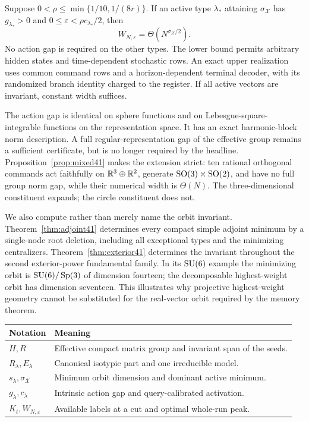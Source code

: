 \begin{theorem}\label{thm:main}
Suppose $0<\rho\le\min\{1/10,1/(8r)\}$. If an active type
$\lambda_*$ attaining $\sigma_{\mathcal X}$ has $g_{\lambda_*}>0$
and $0\le\varepsilon<\rho c_{\lambda_*}/2$, then
\begin{equation}\label{eq:main41}
                 W_{N,\varepsilon}=\Theta(N^{\sigma_{\mathcal X}/2}).
\end{equation}
No action gap is required on the other types. The lower bound permits
arbitrary hidden states and time-dependent stochastic rows. An exact
upper realization uses common command rows and a horizon-dependent
terminal decoder, with its randomized branch identity charged to the
register. If all active vectors are invariant, constant width suffices.
\end{theorem}

The action gap is identical on sphere functions and on Lebesgue-square-
integrable functions on the representation space. It has an exact
harmonic-block norm description. A full regular-representation gap of
the effective group remains a sufficient certificate, but is no longer
required by the headline. Proposition~\ref{prop:mixed41} makes the
extension strict: ten rational orthogonal commands act faithfully on
$\mathbb R^3\oplus\mathbb R^2$, generate $\operatorname{SO}(3)\times\operatorname{SO}(2)$, and have no full
group norm gap, while their numerical width is $\Theta(N)$. The
three-dimensional constituent expands; the circle constituent does not.

We also compute rather than merely name the orbit invariant.
Theorem~\ref{thm:adjoint41} determines every compact simple adjoint
minimum by a single-node root deletion, including all exceptional
types and the minimizing centralizers. Theorem~\ref{thm:exterior41}
determines the invariant throughout the second exterior-power
fundamental family. In its $\operatorname{SU}(6)$ example the minimizing orbit is
$\operatorname{SU}(6)/\operatorname{Sp}(3)$ of dimension fourteen; the decomposable
highest-weight orbit has dimension seventeen. This illustrates why
projective highest-weight geometry cannot be substituted for the
real-vector orbit required by the memory theorem.

\begin{center}
\begin{tabular}{p{}p{}}
\toprule
Notation & Meaning\\
\midrule
$H,R$ & Effective compact matrix group and invariant span of the seeds.\\
$R_\lambda,E_\lambda$ & Canonical isotypic part and one irreducible model.\\
$s_\lambda,\sigma_{\mathcal X}$ & Minimum orbit dimension and dominant active minimum.\\
$g_\lambda,c_\lambda$ & Intrinsic action gap and query-calibrated activation.\\
$K_t,W_{N,\varepsilon}$ & Available labels at a cut and optimal whole-run peak.\\
\bottomrule
\end{tabular}
\end{center}

